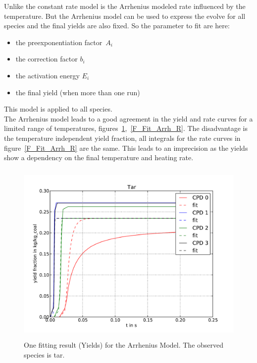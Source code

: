 Unlike the constant rate model is the Arrhenius modeled rate influenced by the temperature. But the Arrhenius model can be used to express the evolve for all species and the final yields are also fixed. So the parameter to fit are here:
\begin{itemize}
 \item the preexponentiation factor~$A_i$
 \item the correction factor $b_i$
 \item the activation energy $E_i$
 \item the final yield (when more than one run)
\end{itemize}
This model is applied to all species.\\

The Arrhenius model leads to a good agreement in the yield and rate curves for a limited range of temperatures, figures~\ref{F_Fit_Arrh_Y},~\ref{F_Fit_Arrh_R}. The disadvantage is the temperature independent yield fraction, all integrals for the rate curves in figure~\ref{F_Fit_Arrh_R} are the same. This leads to an imprecision as the yields show a dependency on the final temperature and heating rate.


\begin{figure}
\centering%
\includegraphics[height=9cm,angle=0]{Figures/CPD-Fit_result_Arrh_Tar_Y}
\caption{One fitting result (Yields) for the Arrhenius Model. The observed species is tar.}
\label{F_Fit_Arrh_Y}
\end{figure}

